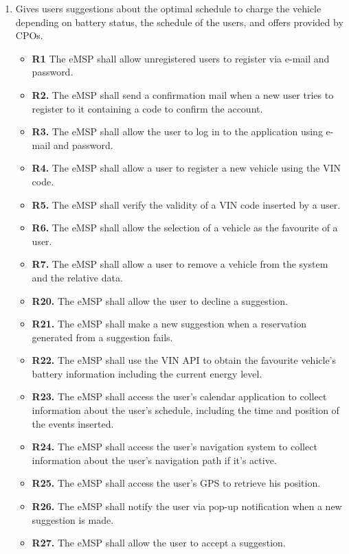 \documentclass{Configuration_Files/PoliMi3i_thesis}
\begin{document}
\begin{enumerate}[label=\textbf{G\arabic*}]
    \item Gives users suggestions about the optimal schedule to charge the vehicle depending on battery status, the schedule of the users, and offers provided by CPOs.
        \begin{itemize}
            \item \textbf{R1} The eMSP shall allow unregistered users to register via e-mail and password.
            \item \textbf{R2.} The eMSP shall send a confirmation mail when a new user tries to register to it containing a code to confirm the account.
            \item \textbf{R3.} The eMSP shall allow the user to log in to the application using e-mail and password.
            \item \textbf{R4.} The eMSP shall allow a user to register a new vehicle using the VIN code.
            \item \textbf{R5.} The eMSP shall verify the validity of a VIN code inserted by a user.
            \item \textbf{R6.} The eMSP shall allow the selection of a vehicle as the favourite of a user.
            \item \textbf{R7.} The eMSP shall allow a user to remove a vehicle from the system and the relative data.
            \item \textbf{R20.} The eMSP shall allow the user to decline  a suggestion.
            \item \textbf{R21.} The eMSP shall make a new suggestion when a reservation generated from a suggestion fails.
            \item \textbf{R22.} The eMSP shall use the VIN API to obtain the favourite vehicle's battery information including the current energy level.
            \item \textbf{R23.} The eMSP shall access the user’s calendar application to collect information about the user’s schedule, including the time and position of the events inserted.
            \item \textbf{R24.} The eMSP shall access the user’s navigation system to collect information about the user’s navigation path if it's active.
            \item \textbf{R25.} The eMSP shall access the user’s GPS to retrieve his position.
            \item \textbf{R26.} The eMSP shall notify the user via pop-up notification when a new suggestion is made.
            \item \textbf{R27.} The eMSP shall allow the user to accept a suggestion.

\end{itemize}
\end{enumerate}
\end{document}

